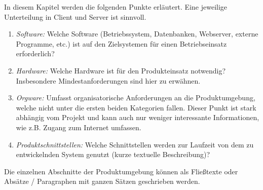 \begin{tcolorbox}
In diesem Kapitel werden die folgenden Punkte erläutert. Eine jeweilige Unterteilung in Client und Server ist sinnvoll.
\begin{enumerate}
	\item \textit{Software:} Welche Software (Betriebssystem, Datenbanken, Webserver, externe Programme, etc.) ist auf den Zielsystemen für einen Betriebseinsatz erforderlich?
	\item \textit{Hardware:} Welche Hardware ist für den Produkteinsatz notwendig? Insbesondere Mindestanforderungen sind hier zu erwähnen.
	\item \textit{Orgware:} Umfasst organisatorische Anforderungen an die Produktumgebung, welche nicht unter die ersten beiden Kategorien fallen. 
	Dieser Punkt ist stark abhängig vom Projekt und kann auch nur weniger interessante Informationen, wie z.B. Zugang zum Internet umfassen.
	\item \textit{Produktschnittstellen:} Welche Schnittstellen werden zur Laufzeit von dem zu entwickelnden System genutzt (kurze textuelle Beschreibung)?
\end{enumerate}

\noindent Die einzelnen Abschnitte der Produktumgebung können als Fließtexte oder Absätze / Paragraphen mit ganzen Sätzen geschrieben werden.
\end{tcolorbox}